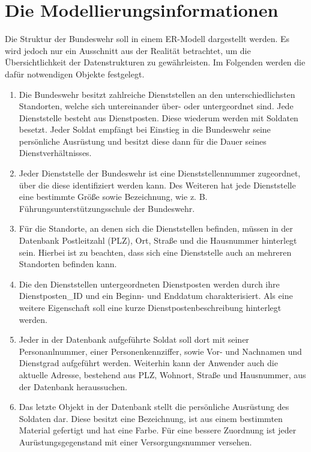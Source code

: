     \section{Die Modellierungsinformationen}
			Die Struktur der Bundeswehr soll in einem ER-Modell dargestellt werden.
			Es wird jedoch nur ein Ausschnitt aus der Realität betrachtet, um die
			Übersichtlichkeit der Datenstrukturen zu gewährleisten. Im Folgenden
			werden die dafür notwendigen Objekte festgelegt.
        \begin{enumerate}
          \item Die Bundeswehr besitzt zahlreiche Dienststellen an den unterschiedlichsten Standorten, welche sich untereinander über- oder untergeordnet sind. Jede Dienststelle besteht aus Dienstposten. Diese wiederum werden mit Soldaten besetzt. Jeder Soldat empfängt bei Einstieg in die Bundeswehr seine persönliche Ausrüstung und besitzt diese dann für die Dauer seines Dienstverhältnisses.
          \item Jeder Dienststelle der Bundeswehr ist eine Dienststellennummer zugeordnet, über die diese identifiziert werden kann. Des Weiteren hat jede Dienststelle eine bestimmte Größe sowie Bezeichnung, wie z. B. Führungsunterstützungsschule der Bundeswehr.
          \item Für die Standorte, an denen sich die Dienststellen befinden, müssen in der Datenbank Postleitzahl (PLZ), Ort, Straße und die Hausnummer hinterlegt sein. Hierbei ist zu beachten, dass sich eine Dienststelle auch an mehreren Standorten befinden kann.
          \item Die den Dienststellen untergeordneten Dienstposten werden durch ihre Dienstposten\_ID und ein Beginn- und Enddatum charakterisiert. Als eine weitere Eigenschaft soll eine kurze Dienstpostenbeschreibung hinterlegt werden.
          \item Jeder in der Datenbank aufgeführte Soldat soll dort mit seiner Personanlnummer, einer Personenkennziffer, sowie Vor- und Nachnamen und Dienstgrad aufgeführt werden. Weiterhin kann der Anwender auch die aktuelle Adresse, bestehend aus PLZ, Wohnort, Straße und Hausnummer, aus der Datenbank heraussuchen.
          \item Das letzte Objekt in der Datenbank stellt die persönliche Ausrüstung des Soldaten dar. Diese besitzt eine Bezeichnung, ist aus einem bestimmten Material gefertigt und hat eine Farbe. Für eine bessere Zuordnung ist jeder Aurüstungsgegenstand mit einer Versorgungsnummer versehen.
        \end{enumerate}
